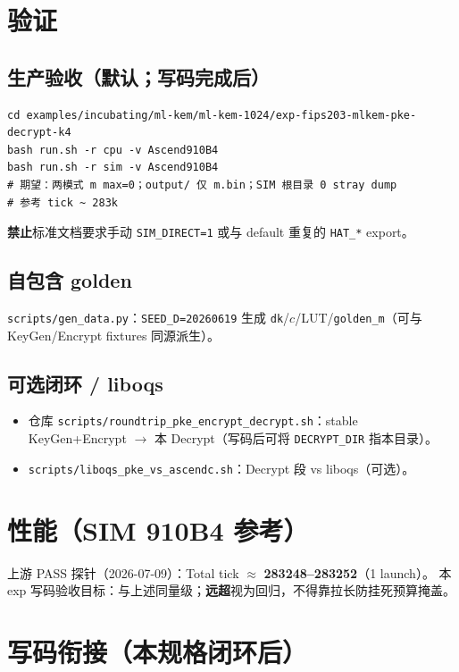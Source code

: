 \documentclass[UTF8,a4paper,11pt]{ctexart}
\begin{document}
\section{验证}
\label{sec:verify}

\subsection{生产验收（默认；写码完成后）}

\begin{verbatim}
cd examples/incubating/ml-kem/ml-kem-1024/exp-fips203-mlkem-pke-decrypt-k4
bash run.sh -r cpu -v Ascend910B4
bash run.sh -r sim -v Ascend910B4
# 期望：两模式 m max=0；output/ 仅 m.bin；SIM 根目录 0 stray dump
# 参考 tick ~ 283k
\end{verbatim}

\textbf{禁止}标准文档要求手动 \texttt{SIM\_DIRECT=1} 或与 default 重复的 \texttt{HAT\_*} export。

\subsection{自包含 golden}

\texttt{scripts/gen\_data.py}：\texttt{SEED\_D=20260619} 生成 \texttt{dk}/$c$/LUT/\texttt{golden\_m}（可与 KeyGen/Encrypt fixtures 同源派生）。

\subsection{可选闭环 / liboqs}

\begin{itemize}
  \item 仓库 \texttt{scripts/roundtrip\_pke\_encrypt\_decrypt.sh}：stable KeyGen+Encrypt $\to$ 本 Decrypt（写码后可将 \texttt{DECRYPT\_DIR} 指本目录）。
  \item \texttt{scripts/liboqs\_pke\_vs\_ascendc.sh}：Decrypt 段 vs liboqs（可选）。
\end{itemize}

\section{性能（SIM 910B4 参考）}

上游 PASS 探针（2026-07-09）：Total tick $\approx$ \textbf{283248--283252}（1 launch）。
本 exp 写码验收目标：与上述同量级；\textbf{远超}视为回归，不得靠拉长防挂死预算掩盖。

\section{写码衔接（本规格闭环后）}
\end{document}
